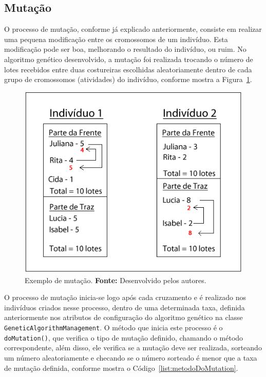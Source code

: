 \subsection{Mutação} \label{mutacao_subsection}
\par O processo de mutação, conforme já explicado anteriormente, consiste em realizar uma pequena modificação entre os cromossomos
de um indivíduo. Esta modificação pode ser boa, melhorando o resultado do indivíduo, ou ruim. No algoritmo genético desenvolvido, 
a mutação foi realizada trocando o número de lotes recebidos entre duas costureiras escolhidas aleatoriamente dentro de cada grupo de cromossomos (atividades) do indivíduo, conforme mostra a Figura~\ref{fig:ex_mutacao}.
\newpage
\begin{figure}[h!]
	\centerline{\includegraphics[scale=0.7]{./imagens/mutacao_cromossomo.png}}
	\caption[Exemplo de mutação.]
	{Exemplo de mutação.
		\textbf{Fonte:} Desenvolvido pelos autores.}
	\label{fig:ex_mutacao}
\end{figure}


\par O processo de mutação inicia-se logo após cada cruzamento e é realizado
nos indivíduos criados nesse processo, dentro de uma determinada taxa, definida
anteriormente nos atributos de configuração do algoritmo genético na classe
\texttt{GeneticAlgorithmMana\-gement}. O método que inicia este processo é o \texttt{doMutation()}, que verifica o tipo de mutação definido, chamando o método correspondente, além disso, ele verifica se a mutação deve ser realizada, sorteando um número aleatoriamente e checando se o número sorteado é menor que a taxa de mutação definida, conforme mostra o Código~\ref{list:metodoDoMutation}.

